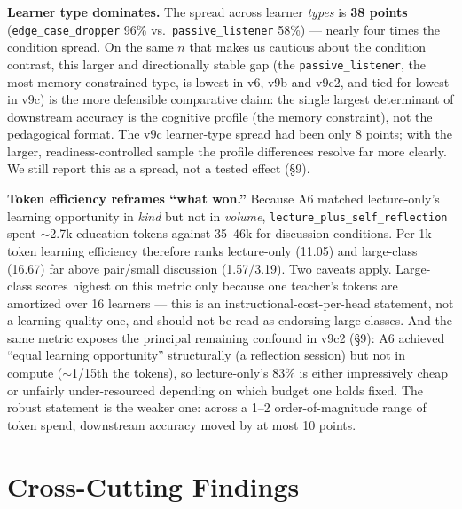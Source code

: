 \documentclass[11pt]{article}
\begin{document}
\textbf{Learner type dominates.}  The spread across learner \emph{types} is
\textbf{38 points} (\texttt{edge\_case\_dropper} 96\% vs.\ \texttt{passive\_listener}
58\%) --- nearly four times the condition spread.  On the same $n$ that makes us
cautious about the condition contrast, this larger and directionally stable gap (the
\texttt{passive\_listener}, the most memory-constrained type, is lowest in v6, v9b
and v9c2, and tied for lowest in v9c) is the more defensible comparative claim: the single largest
determinant of downstream accuracy is the cognitive profile (the memory constraint),
not the pedagogical format.  The v9c learner-type spread had been only 8 points; with
the larger, readiness-controlled sample the profile differences resolve far more
clearly.  We still report this as a spread, not a tested effect (\S9).

\textbf{Token efficiency reframes ``what won.''}  Because A6 matched lecture-only's
learning opportunity in \emph{kind} but not in \emph{volume},
\texttt{lecture\_plus\_self\_reflection} spent $\sim$2.7k education tokens against
35--46k for discussion conditions.  Per-1k-token learning efficiency therefore ranks
lecture-only (11.05) and large-class (16.67) far above pair/small discussion
(1.57/3.19).  Two caveats apply.  Large-class scores highest on this metric only
because one teacher's tokens are amortized over 16 learners --- this is an
instructional-cost-per-head statement, not a learning-quality one, and should not be
read as endorsing large classes.  And the same metric exposes the principal remaining
confound in v9c2 (\S9): A6 achieved ``equal learning opportunity'' structurally (a
reflection session) but not in compute ($\sim$1/15th the tokens), so lecture-only's
83\% is either impressively cheap or unfairly under-resourced depending on which
budget one holds fixed.  The robust statement is the weaker one: across a 1--2
order-of-magnitude range of token spend, downstream accuracy moved by at most 10
points.

\section{Cross-Cutting Findings}
\end{document}

